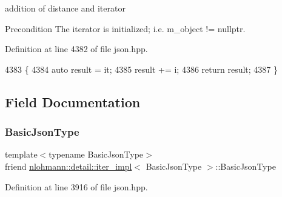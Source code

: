 addition of distance and iterator 

\begin{DoxyPrecond}{Precondition}
The iterator is initialized; i.\+e. {\ttfamily m\+\_\+object != nullptr}. 
\end{DoxyPrecond}


Definition at line 4382 of file json.\+hpp.


\begin{DoxyCode}
4383     \{
4384         \textcolor{keyword}{auto} result = it;
4385         result += i;
4386         \textcolor{keywordflow}{return} result;
4387     \}
\end{DoxyCode}


\subsection{Field Documentation}
\mbox{\label{classnlohmann_1_1detail_1_1iter__impl_abf18f18793f84b0222aebb5a2a87da7a}} 
\subsubsection{\texorpdfstring{Basic\+Json\+Type}{BasicJsonType}}
{\footnotesize\ttfamily template$<$typename Basic\+Json\+Type$>$ \\
friend \hyperlink{classnlohmann_1_1detail_1_1iter__impl}{nlohmann\+::detail\+::iter\+\_\+impl}$<$ Basic\+Json\+Type $>$\+::Basic\+Json\+Type\hspace{0.3cm}{\ttfamily [private]}}



Definition at line 3916 of file json.\+hpp.

\mbox{\label{classnlohmann_1_1detail_1_1iter__impl_a28328d17a18d9754c89c5c8159677a6f}} 

